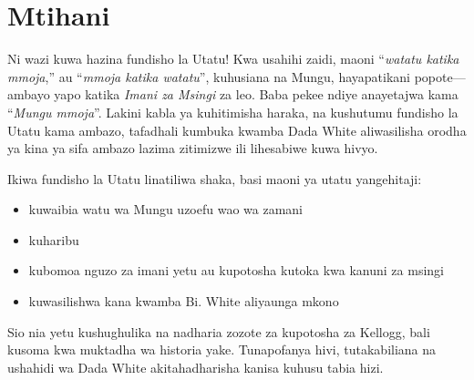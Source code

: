 \section*{Mtihani}

Ni wazi kuwa  hazina fundisho la Utatu! Kwa usahihi zaidi, maoni “\textit{watatu katika mmoja},” au “\textit{mmoja katika watatu}”, kuhusiana na Mungu, hayapatikani popote—ambayo yapo katika \textit{Imani za Msingi} za leo. Baba pekee ndiye anayetajwa kama “\textit{Mungu mmoja}”. Lakini kabla ya kuhitimisha haraka, na kushutumu fundisho la Utatu kama ambazo, tafadhali kumbuka kwamba Dada White aliwasilisha orodha ya kina ya sifa ambazo lazima zitimizwe ili lihesabiwe kuwa hivyo.

Ikiwa fundisho la Utatu linatiliwa shaka, basi maoni ya utatu yangehitaji:
\begin{itemize}
    \item kuwaibia watu wa Mungu uzoefu wao wa zamani
    \item kuharibu 
    \item kubomoa nguzo za imani yetu au kupotosha kutoka kwa kanuni za msingi
    \item kuwasilishwa kana kwamba Bi. White aliyaunga mkono
\end{itemize}

Sio nia yetu kushughulika na nadharia zozote za kupotosha za Kellogg, bali kusoma  kwa muktadha wa historia yake. Tunapofanya hivi, tutakabiliana na ushahidi wa Dada White akitahadharisha kanisa kuhusu tabia hizi.


